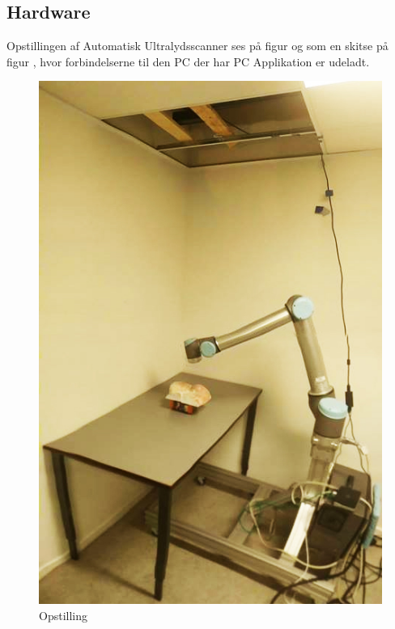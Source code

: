 \subsection{Hardware}
Opstillingen af Automatisk Ultralydsscanner ses på figur \label{setup} og som en skitse på figur \label{3dsetup}, hvor forbindelserne til den PC der har PC Applikation er udeladt. 

\begin{figure}[H]
  \centering
  \begin{minipage}{0.4\textwidth}
    \includegraphics[width=\textwidth]{figurer/setup}
    \caption{Opstilling}
    \label{setup}
  \end{minipage}
  \hfill
  \begin{minipage}{0.4\textwidth}

\end{minipage}
\end{figure}

